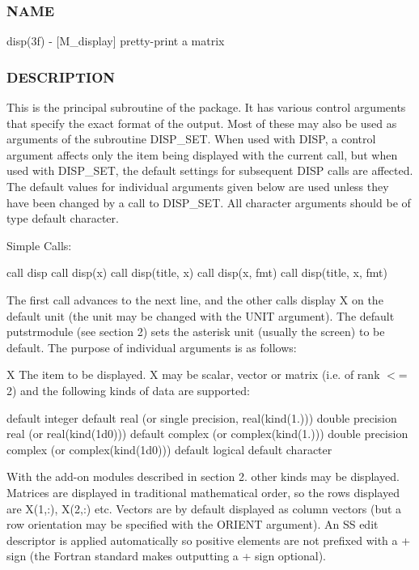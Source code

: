 \subsubsection*{N\+A\+ME}

disp(3f) -\/ \mbox{[}M\+\_\+display\mbox{]} pretty-\/print a matrix 

\subsubsection*{D\+E\+S\+C\+R\+I\+P\+T\+I\+ON}

This is the principal subroutine of the package. It has various control arguments that specify the exact format of the output. Most of these may also be used as arguments of the subroutine D\+I\+S\+P\+\_\+\+S\+ET. When used with D\+I\+SP, a control argument affects only the item being displayed with the current call, but when used with D\+I\+S\+P\+\_\+\+S\+ET, the default settings for subsequent D\+I\+SP calls are affected. The default values for individual arguments given below are used unless they have been changed by a call to D\+I\+S\+P\+\_\+\+S\+ET. All character arguments should be of type default character.

Simple Calls\+: \begin{DoxyVerb}  call disp
  call disp(x)
  call disp(title, x)
  call disp(x, fmt)
  call disp(title, x, fmt)
\end{DoxyVerb}


The first call advances to the next line, and the other calls display X on the default unit (the unit may be changed with the U\+N\+IT argument). The default putstrmodule (see section 2) sets the asterisk unit (usually the screen) to be default. The purpose of individual arguments is as follows\+:

X The item to be displayed. X may be scalar, vector or matrix (i.\+e. of rank $<$= 2) and the following kinds of data are supported\+:

default integer default real (or single precision, real(kind(1.))) double precision real (or real(kind(1d0))) default complex (or complex(kind(1.))) double precision complex (or complex(kind(1d0))) default logical default character

With the add-\/on modules described in section 2. other kinds may be displayed. Matrices are displayed in traditional mathematical order, so the rows displayed are X(1,\+:), X(2,\+:) etc. Vectors are by default displayed as column vectors (but a row orientation may be specified with the O\+R\+I\+E\+NT argument). An SS edit descriptor is applied automatically so positive elements are not prefixed with a + sign (the Fortran standard makes outputting a + sign optional).

